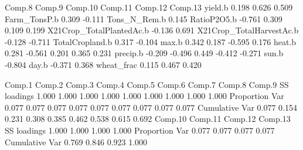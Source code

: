 \documentclass{report}
\begin{document}
\begin{Schunk}
\begin{Soutput}
                         Comp.8 Comp.9 Comp.10 Comp.11 Comp.12 Comp.13
yield.b                   0.198  0.626  0.509                         
Farm_TonsP.b              0.309 -0.111                                
Tons_N_Rem.b              0.145                                       
RatioP2O5.b              -0.761         0.309   0.109   0.199         
X21Crop_TotalPlantedAc.b               -0.136                   0.691 
X21Crop_TotalHarvestAc.b               -0.128                  -0.711 
TotalCropland.b                         0.317          -0.104         
max.b                     0.342         0.187  -0.595   0.176         
heat.b                    0.281 -0.561  0.201   0.365   0.231         
precip.b                 -0.209 -0.496  0.449  -0.412  -0.271         
sun.b                                                  -0.804         
day.b                                          -0.371   0.368         
wheat_frac                0.115         0.467   0.420                 

               Comp.1 Comp.2 Comp.3 Comp.4 Comp.5 Comp.6 Comp.7 Comp.8 Comp.9
SS loadings     1.000  1.000  1.000  1.000  1.000  1.000  1.000  1.000  1.000
Proportion Var  0.077  0.077  0.077  0.077  0.077  0.077  0.077  0.077  0.077
Cumulative Var  0.077  0.154  0.231  0.308  0.385  0.462  0.538  0.615  0.692
               Comp.10 Comp.11 Comp.12 Comp.13
SS loadings      1.000   1.000   1.000   1.000
Proportion Var   0.077   0.077   0.077   0.077
Cumulative Var   0.769   0.846   0.923   1.000
\end{Soutput}
\end{Schunk}
\end{document}
